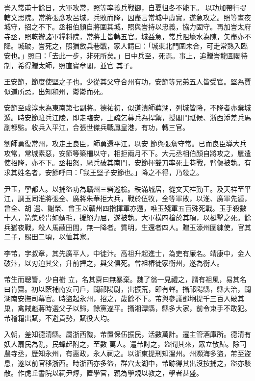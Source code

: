 \begin{pinyinscope}
 訔入常甫十餘日，大軍攻常，照等率義兵戰御，自夏徂冬不能下。
 以功加帶行提轄文思院。常將張彥攻呂城，兵敗而降，因盡言常城中虛實，遂急攻之。照等晝夜城守，招之不下。丞相伯顏自將圍其城，照與訔持以忠義，協力固守。再加訔太府寺丞，照乾辦諸軍糧料院，常將士皆轉五官。城益急，常兵阻壕水為陳，矢盡亦不降。城破，訔死之，照猶斂兵巷戰，家人請曰：「城東北門圍未合，可走常熟入臨安也。」照曰：「去此一步，非死所矣。」日中兵至，死焉。事上，追贈訔龍圖閣待制，希得贈太師，照直寶章閣，並官
 其子。



 王安節，節度使堅之子也。少從其父守合州有功，安節等兄弟五人皆受官。堅為賈似道所忌，出知和州，鬱鬱而死。



 安節至咸淳末為東南第七副將。德祐初，似道潰師蕪湖，列城皆降，不降者亦棄城遁。時安節駐兵江陵，即走臨安，上疏乞募兵為捍禦，授閣門祗候、浙西添差兵馬副都監。收兵入平江，合張世傑兵戰鳳皇港，有功，轉三官。



 劉師勇復常州，攻走王良臣，師勇還平江，以安
 節與張詹守常。已而良臣導大兵攻常，常城素惡，安節等築柵以守，相拒兩月不下。大元丞相伯顏自將攻之，屢遣使招降，亦不下。丞相怒，麾兵破其南門，安節揮雙刀率死士巷戰，臂傷被執。有求其姓名者，安節呼曰：「我王堅子安節也。」降之不得，乃殺之。



 尹玉，寧都人。以捕盜功為贛州三砦巡檢。秩滿城居，從文天祥勤王。及天祥至平江，調玉同淮將張全、廣將朱華拒大兵，戰於伍牧，全等軍敗，以淮、廣軍先遁，曾全、胡
 遇、謝榮、曾玉以贛州四指揮軍亦遁，唯玉殘軍五百殊死戰。玉手殺數十人，箭集於胄如蝟毛，援絕力屈，遂被執。大軍橫四槍於其項，以梃擊之死。餘兵猶夜戰，殺人馬蔽田間，無一降者。質明，生還者四人。贈玉濠州圍練使，官其二子，賜田二頃，以恤其家。



 李芾，字叔章，其先廣平人，中徙汴。高祖升起進士，為吏有廉名。靖康中，金人破汴，以刃迫其父，升前捍之，與父俱死。曾祖椿徙家衡州，遂為衡人。



 芾生而聰警，少自樹
 立，名其齋曰無暴棄。魏了翁一見禮之，謂有祖風，易其名曰肯齋。初以蔭補南安司戶，闢祁陽尉，出振荒，即有聲。攝祁陽縣，縣大治，闢湖南安撫司幕官。時盜起永州，招之，歲餘不下。芾與參議鄧坰提千三百人破其巢，禽賊魁蔣時選父子以歸，餘黨遂平。攝湘潭縣，縣多大家，前令束手不敢犯。芾稽籍出賦，不避貴勢，賦役大均。



 入朝，差知德清縣。屬浙西饑，芾置保伍振民，活數萬計。遷主管酒庫所。德清有妖人扇民為亂，民蜂起附之，至數
 萬人。遣芾討之，盜聞其來，眾立散歸。除司農寺丞，歷知永州，有惠政，永人祠之。以浙東提刑知溫州。州瀕海多盜，芾至盜息，遂以前官移浙西。時浙西亦多盜，群穴太湖中，芾跡得其出沒按捕之，盜亦駭散。作虎丘書院以祠尹焞，置學官，親為學規以教之，學者甚盛。




\end{pinyinscope}
